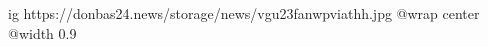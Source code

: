  
 
 
 
 

\ifcmt
  ig https://donbas24.news/storage/news/vgu23fanwpviathh.jpg
  @wrap center
  @width 0.9
\fi
